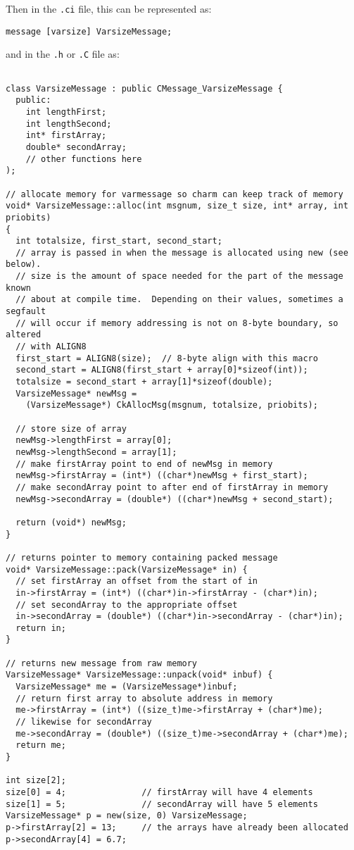 Then in the {\tt .ci} file, this can be represented as: 

\begin{verbatim}
message [varsize] VarsizeMessage;
\end{verbatim}

and in the {\tt .h} or {\tt .C} file as:

\begin{verbatim} 

class VarsizeMessage : public CMessage_VarsizeMessage { 
  public: 
    int lengthFirst;
    int lengthSecond;
    int* firstArray;
    double* secondArray;
    // other functions here
);

// allocate memory for varmessage so charm can keep track of memory
void* VarsizeMessage::alloc(int msgnum, size_t size, int* array, int priobits)
{
  int totalsize, first_start, second_start;
  // array is passed in when the message is allocated using new (see below).
  // size is the amount of space needed for the part of the message known
  // about at compile time.  Depending on their values, sometimes a segfault
  // will occur if memory addressing is not on 8-byte boundary, so altered
  // with ALIGN8
  first_start = ALIGN8(size);  // 8-byte align with this macro
  second_start = ALIGN8(first_start + array[0]*sizeof(int));
  totalsize = second_start + array[1]*sizeof(double);
  VarsizeMessage* newMsg = 
    (VarsizeMessage*) CkAllocMsg(msgnum, totalsize, priobits);
  
  // store size of array
  newMsg->lengthFirst = array[0];
  newMsg->lengthSecond = array[1];
  // make firstArray point to end of newMsg in memory
  newMsg->firstArray = (int*) ((char*)newMsg + first_start);
  // make secondArray point to after end of firstArray in memory
  newMsg->secondArray = (double*) ((char*)newMsg + second_start);

  return (void*) newMsg;
}

// returns pointer to memory containing packed message
void* VarsizeMessage::pack(VarsizeMessage* in) {
  // set firstArray an offset from the start of in
  in->firstArray = (int*) ((char*)in->firstArray - (char*)in);
  // set secondArray to the appropriate offset
  in->secondArray = (double*) ((char*)in->secondArray - (char*)in);
  return in;
}

// returns new message from raw memory
VarsizeMessage* VarsizeMessage::unpack(void* inbuf) {
  VarsizeMessage* me = (VarsizeMessage*)inbuf;
  // return first array to absolute address in memory
  me->firstArray = (int*) ((size_t)me->firstArray + (char*)me);
  // likewise for secondArray
  me->secondArray = (double*) ((size_t)me->secondArray + (char*)me);
  return me;
}

int size[2];
size[0] = 4;               // firstArray will have 4 elements
size[1] = 5;               // secondArray will have 5 elements 
VarsizeMessage* p = new(size, 0) VarsizeMessage;
p->firstArray[2] = 13;     // the arrays have already been allocated 
p->secondArray[4] = 6.7; 



\end{verbatim}

